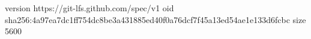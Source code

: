 version https://git-lfs.github.com/spec/v1
oid sha256:4a97ea7dc1ff754dc8be3a431885ed40f0a76dcf7f45a13ed54ae1e133d6fcbc
size 5600
